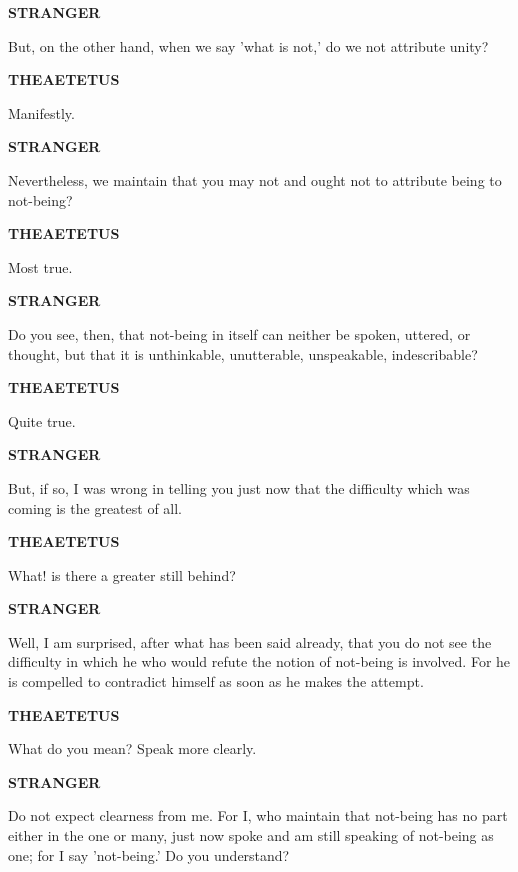 \documentclass[11pt,letter]{article}
\begin{document}
\par \textbf{STRANGER}
\par   But, on the other hand, when we say 'what is not,' do we not attribute unity?

\par \textbf{THEAETETUS}
\par   Manifestly.

\par \textbf{STRANGER}
\par   Nevertheless, we maintain that you may not and ought not to attribute being to not-being?

\par \textbf{THEAETETUS}
\par   Most true.

\par \textbf{STRANGER}
\par   Do you see, then, that not-being in itself can neither be spoken, uttered, or thought, but that it is unthinkable, unutterable, unspeakable, indescribable?

\par \textbf{THEAETETUS}
\par   Quite true.

\par \textbf{STRANGER}
\par   But, if so, I was wrong in telling you just now that the difficulty which was coming is the greatest of all.

\par \textbf{THEAETETUS}
\par   What! is there a greater still behind?

\par \textbf{STRANGER}
\par   Well, I am surprised, after what has been said already, that you do not see the difficulty in which he who would refute the notion of not-being is involved. For he is compelled to contradict himself as soon as he makes the attempt.

\par \textbf{THEAETETUS}
\par   What do you mean? Speak more clearly.

\par \textbf{STRANGER}
\par   Do not expect clearness from me. For I, who maintain that not-being has no part either in the one or many, just now spoke and am still speaking of not-being as one; for I say 'not-being.' Do you understand?
\end{document}
